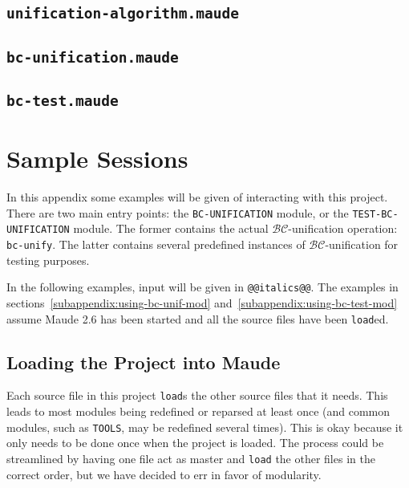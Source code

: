 \documentclass[11pt]{article}
\newcommand{\BC}{\mathcal{BC}}
\newcommand{\TitleListing}[1]{\texorpdfstring{\lstinline|#1|}{#1}}
\begin{document}
\subsection{\TitleListing{unification-algorithm.maude}}
\label{subappendix:unif-alg-theory}

\vspace{2em}

\subsection{\TitleListing{bc-unification.maude}}
\label{subappendix:bc-unif-mod}

\vspace{2em}

\subsection{\TitleListing{bc-test.maude}}
\label{subappendix:test-mod}


\newpage
\section{Sample Sessions}\label{appendix:samples}

In this appendix some examples will be given of interacting with this project.
There are two main entry points: the \lstinline|BC-UNIFICATION| module, or the
\lstinline|TEST-BC-UNIFICATION| module. The former contains the actual
$\BC$-unification operation: \lstinline|bc-unify|. The latter contains several
predefined instances of $\BC$-unification for testing purposes.

In the following examples, input will be given in \lstinline|@@italics@@|. The
examples in sections~\ref{subappendix:using-bc-unif-mod}
and~\ref{subappendix:using-bc-test-mod} assume Maude 2.6 has been started and
all the source files have been \lstinline|load|ed.

\subsection{Loading the Project into Maude}\label{subappendix:loading}

Each source file in this project \lstinline|load|s the other source files that
it needs. This leads to most modules being redefined or reparsed at least once
(and common modules, such as \lstinline|TOOLS|, may be redefined several
times). This is okay because it only needs to be done once when the project is
loaded. The process could be streamlined by having one file act as master and
\lstinline|load| the other files in the correct order, but we have decided to
err in favor of modularity.
\vspace{1ex}
\end{document}

